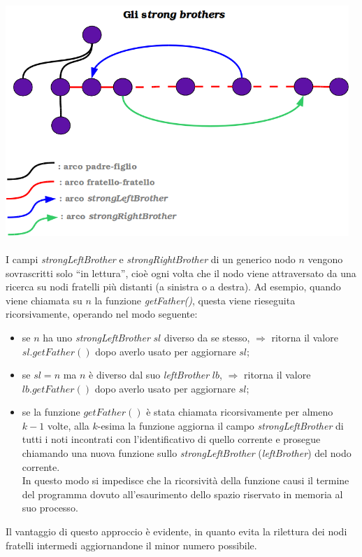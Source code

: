 \documentclass[a4paper,11pt]{report}
\begin{document}
\paragraph{}
\centerline{\includegraphics[width=130mm]{images/strong_brothers.png}} 
\paragraph{}
I campi \emph{strongLeftBrother} e \emph{strongRightBrother} di un generico nodo $n$ vengono sovrascritti solo ``in lettura'', cioè ogni
volta che il nodo viene attraversato da una 
ricerca su nodi fratelli più distanti (a sinistra o a destra). Ad esempio, quando viene chiamata su $n$ la funzione \emph{getFather()},
questa viene rieseguita ricorsivamente,
operando nel modo seguente:
\begin{itemize}
 \item se $n$ ha uno \emph{strongLeftBrother} $sl$ diverso da se stesso, $\Longrightarrow$ ritorna il valore $sl.getFather()$ dopo averlo
usato per aggiornare $sl$;
 \item se $sl=n$ ma $n$ è diverso dal suo \emph{leftBrother} $lb$, $\Longrightarrow$ ritorna il valore $lb.getFather()$ dopo averlo usato
per aggiornare $sl$;
 \item se la funzione $getFather()$ è stata chiamata ricorsivamente per almeno $k-1$ volte, alla $k$-esima la funzione aggiorna il campo
\emph{strongLeftBrother} di
tutti i noti incontrati con l'identificativo di quello corrente e prosegue chiamando una nuova funzione sullo \emph{strongLeftBrother}
(\emph{leftBrother}) del nodo corrente.\\
In questo modo si impedisce che la ricorsività della funzione causi il termine del programma dovuto all'esaurimento dello spazio riservato
in memoria al suo processo. 
\end{itemize}
Il vantaggio di questo approccio è evidente, in quanto evita la rilettura dei nodi fratelli intermedi aggiornandone il minor numero
possibile. 
\end{document}
